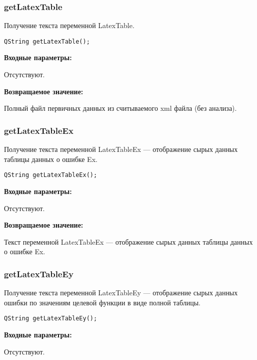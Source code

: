 \documentclass[a4paper,12pt]{article}
\begin{document}
\subsubsection{getLatexTable}\label{getLatexTable}

Получение текста переменной LatexTable.


\begin{lstlisting}[label=code_syntax_getLatexTable,caption=Синтаксис]
QString getLatexTable();
\end{lstlisting}

\textbf{Входные параметры:}

Отсутствуют.

\textbf{Возвращаемое значение:}

Полный файл первичных данных из считываемого xml файла (без анализа).


\subsubsection{getLatexTableEx}\label{getLatexTableEx}

Получение текста переменной LatexTableEx --- отображение сырых данных таблицы данных о ошибке Ex.


\begin{lstlisting}[label=code_syntax_getLatexTableEx,caption=Синтаксис]
QString getLatexTableEx();
\end{lstlisting}

\textbf{Входные параметры:}

Отсутствуют.

\textbf{Возвращаемое значение:}

Текст переменной LatexTableEx --- отображение сырых данных таблицы данных о ошибке Ex.


\subsubsection{getLatexTableEy}\label{getLatexTableEy}

Получение текста переменной LatexTableEy --- отображение сырых данных ошибки по значениям целевой функции в виде полной таблицы.


\begin{lstlisting}[label=code_syntax_getLatexTableEy,caption=Синтаксис]
QString getLatexTableEy();
\end{lstlisting}

\textbf{Входные параметры:}

Отсутствуют.
\end{document}
